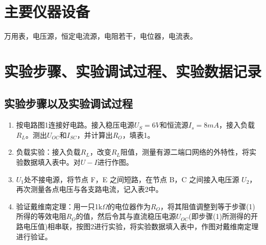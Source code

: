 \documentclass{../source/Experiment}
\begin{document}
    \section{主要仪器设备}
            万用表，电压源，恒定电流源，电阻若干，电位器，电流表。
    \section{实验步骤、实验调试过程、实验数据记录}
        \subsection{实验步骤以及实验调试过程}
            \begin{enumerate}
                \item 按电路图1连接好电路。接入稳压电源$U_S = 6V$和恒流源$I_s = 8mA$，接入负载$R_L$。测出$U_{OC}$和$I_{SC}$，并计算出$R_O$，填表1。
                \item 负载实验：接入负载$R_L$，改变$R_L$阻值，测量有源二端口网络的外特性，将实验数据填入表中。对$U-I$进行作图。
                \item $U_1$处不接电源，将节点 F，E 之间短路，在节点 B，C 之间接入电压源 $U_2$，再次测量各点电压与各支路电流，记入表2中。
                \item 验证戴维南定理：用一只1k$\Omega$的电位器作为$R_O$，将其阻值调整到等于步骤(1)所得的等效电阻$R_O$的值，然后令其与直流稳压电源$U_{OC}$(即步骤(1)所测得的开路电压值)相串联，按图2进行实验，将实验数据填入表中，作图对戴维南定理进行验证。
            \end{enumerate}
\end{document}
